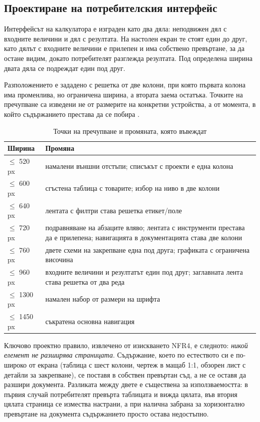 \subsection{Проектиране на потребителския интерфейс}
\label{subsec:uidesign}

Интерфейсът на калкулатора е изграден като два дяла: неподвижен дял с входните
величини и дял с резултата. На настолен екран те стоят един до друг, като дялът с
входните величини е прилепен и има собствено превъртане, за да остане видим, докато
потребителят разглежда резултата. Под определена ширина двата дяла се подреждат един
под друг.

Разположението е зададено с решетка от две колони, при която първата колона има
променлива, но ограничена ширина, а втората заема остатъка. Точките на пречупване са
изведени не от размерите на конкретни устройства, а от момента, в който съдържанието
престава да се побира .

\begin{table}[htbp]
\centering
\caption{Точки на пречупване и промяната, която въвеждат}
\label{tab:breakpoints}
{\fontsize{10}{12}\selectfont
\begin{tabular}{@{}L{2.4cm}L{10.6cm}@{}}
\toprule
\textbf{Ширина} & \textbf{Промяна} \\
\midrule
$\le$ 520 px & намалени външни отстъпи; списъкът с проекти е една колона \\
$\le$ 600 px & сгъстена таблица с товарите; избор на ниво в две колони \\
$\le$ 640 px & лентата с филтри става решетка етикет/поле \\
$\le$ 720 px & подравняване на абзаците вляво; лентата с инструменти престава да е прилепена; навигацията в документацията става две колони \\
$\le$ 760 px & двете схеми на закрепване една под друга; графиката с ограничена височина \\
$\le$ 960 px & входните величини и резултатът един под друг; заглавната лента става решетка от два реда \\
$\le$ 1300 px & намален набор от размери на шрифта \\
$\le$ 1450 px & съкратена основна навигация \\
\bottomrule
\end{tabular}}
\end{table}

Ключово проектно правило, извлечено от изискването NFR4, е следното: \emph{никой
елемент не разширява страницата}. Съдържание, което по естеството си е по-широко от
екрана (таблица с шест колони, чертеж в мащаб 1:1, обзорен лист с детайли за
закрепване), се поставя в собствен превъртан съд, а не се оставя да разшири
документа. Разликата между двете е съществена за използваемостта: в първия случай
потребителят превърта таблицата и вижда цялата, във втория цялата страница се измества
настрани, а при налична забрана за хоризонтално превъртане на документа съдържанието
просто остава недостъпно.

